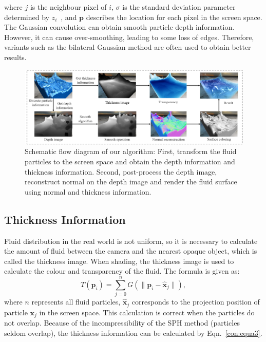\documentclass[times,twocolumn,final]{elsarticle}
\begin{document}
where $j$ is the neighbour pixel of $i$, $\sigma$ is the standard deviation parameter determined by $z_i$~\cite{truong2018narrow}, and ${\mathbf{p}}$ describes the location for each pixel in the screen space. 
The Gaussian convolution can obtain smooth particle depth information. However, it can cause over-smoothing, leading to some loss of edges. Therefore, variants such as the bilateral Gaussian method are often used to obtain better results.

\begin{figure}[!t]
\centering
\includegraphics[scale=.6]{figs/figure2_b.png}
\caption{Schematic flow diagram of our algorithm: First, transform the fluid particles to the screen space and obtain the depth information and thickness information. Second, post-process the depth image, reconstruct normal on the depth image and render the fluid surface using normal and thickness information.}
\label{fig:figure2}
\end{figure}

\subsection{Thickness Information}
Fluid distribution in the real world is not uniform, so it is necessary to calculate the amount of fluid between the camera and the nearest opaque object, which is called the thickness image. When shading, the thickness image is used to calculate the colour and transparency of the fluid\cite{ref:ref14}. The formula is given as:
\begin{equation}
    T(\mathbf{{p}}_i)=\sum_{j=0}^{n} G\left( \| \mathbf{{p}}_i - \mathbf{\hat{x}}_j \| \right), 
\label{con:equa3}
\end{equation}
where $n$ represents all fluid particles, $\mathbf{\hat{x}}_j$ corresponds to the projection position of particle $\mathbf{{x}}_j$ in the screen space. This calculation is correct when the particles do not overlap. Because of the incompressibility of the SPH method (particles seldom overlap), the thickness information can be calculated by Eqn.~\ref{con:equa3}.
\end{document}
